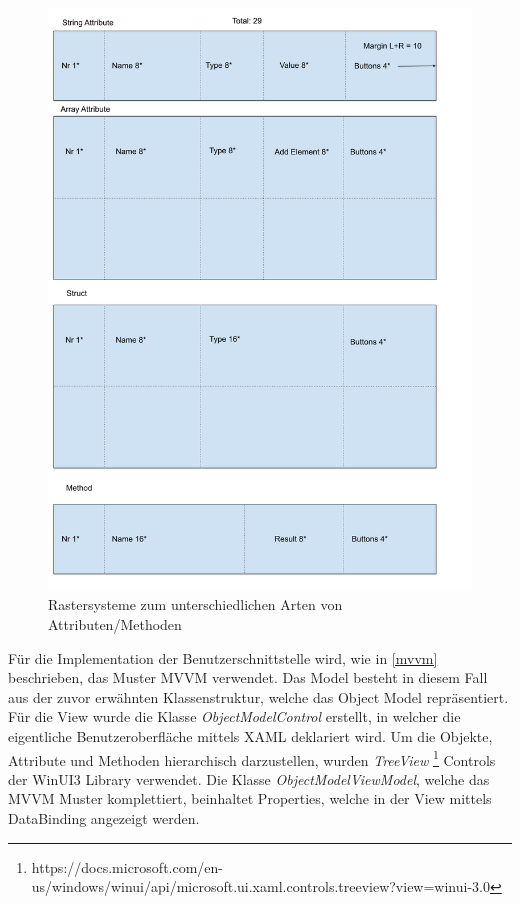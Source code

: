\begin{figure}
   \centering
   \includegraphics[width=1.0\textwidth]{gfx/Single Object Content Grid.png}
   \caption{
      Rastersysteme zum unterschiedlichen Arten von Attributen/Methoden
      }
      \label{fig:singleObjectContentGrid}
\end{figure}


Für die Implementation der Benutzerschnittstelle wird, wie in \ref{mvvm} beschrieben, das Muster \ac{MVVM} verwendet.
Das Model besteht in diesem Fall aus der zuvor erwähnten Klassenstruktur, welche das Object Model repräsentiert.
Für die View wurde die Klasse \textit{ObjectModelControl} erstellt, in welcher die eigentliche Benutzeroberfläche mittels XAML deklariert wird.
Um die Objekte, Attribute und Methoden hierarchisch darzustellen, wurden  \textit{TreeView} \footnote{https://docs.microsoft.com/en-us/windows/winui/api/microsoft.ui.xaml.controls.treeview?view=winui-3.0} Controls der WinUI3 Library verwendet.
Die Klasse \textit{ObjectModelViewModel}, welche das \ac{MVVM} Muster komplettiert, beinhaltet Properties, welche in der View mittels DataBinding angezeigt werden.


